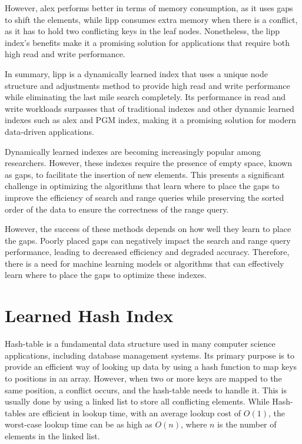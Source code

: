 However, \acrshort{alex} performs better in terms of memory consumption, as it uses gaps to shift the elements, while \acrshort{lipp} consumes extra memory when there is a conflict, as it has to hold two conflicting keys in the leaf nodes. Nonetheless, the \acrshort{lipp} index's benefits make it a promising solution for applications that require both high read and write performance.

In summary, \acrshort{lipp} is a dynamically learned index that uses a unique node structure and adjustments method to provide high read and write performance while eliminating the last mile search completely. Its performance in read and write workloads surpasses that of traditional indexes and other dynamic learned indexes such as \acrshort{alex} and PGM index, making it a promising solution for modern data-driven applications.

Dynamically learned indexes are becoming increasingly popular among researchers. However, these indexes require the presence of empty space, known as gaps, to facilitate the insertion of new elements. This presents a significant challenge in optimizing the algorithms that learn where to place the gaps to improve the efficiency of search and range queries while preserving the sorted order of the data to ensure the correctness of the range query.

However, the success of these methods depends on how well they learn to place the gaps. Poorly placed gaps can negatively impact the search and range query performance, leading to decreased efficiency and degraded accuracy. Therefore, there is a need for machine learning models or algorithms that can effectively learn where to place the gaps to optimize these indexes.


\section{Learned Hash Index}
Hash-table is a fundamental data structure used in many computer science applications, including database management systems. Its primary purpose is to provide an efficient way of looking up data by using a hash function to map keys to positions in an array. However, when two or more keys are mapped to the same position, a conflict occurs, and the hash-table needs to handle it. This is usually done by using a linked list to store all conflicting elements. While Hash-tables are efficient in lookup time, with an average lookup cost of $O(1)$, the worst-case lookup time can be as high as $O(n)$, where $n$ is the number of elements in the linked list.

